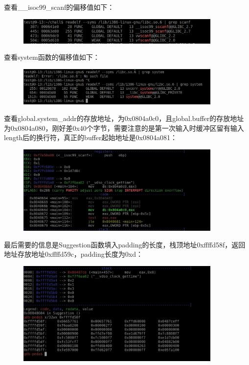 \documentclass{article}
\begin{document}
    查看\_\_isoc99\_scanf的偏移值如下：
    \begin{figure}[H]
    	\begin{center}
    		\includegraphics[width=0.9\textwidth]{2.png}
    	\end{center}
    \end{figure}
    查看system函数的偏移值如下：
    \begin{figure}[H]
    	\begin{center}
    		\includegraphics[width=0.9\textwidth]{3.png}
    	\end{center}
    \end{figure}
    查看global.system\_addr的存放地址，为0x0804a0c0，且global.buffer的存放地址为0x0804a080，刚好差0x40个字节，需要注意的是第一次输入时缓冲区留有输入length后的换行符，真正的buffer起始地址是0x0804a081：
    \begin{figure}[H]
    	\begin{center}
    		\includegraphics[width=0.9\textwidth]{4.png}
    	\end{center}
    \end{figure}
    最后需要的信息是Suggestion函数填入padding的长度，栈顶地址0xffffd58f，返回地址存放地址0xffffd59c，padding长度为0xd：
    \begin{figure}[H]
    	\begin{center}
    		\includegraphics[width=0.9\textwidth]{5.png}
    	\end{center}
    \end{figure}
\end{document}
